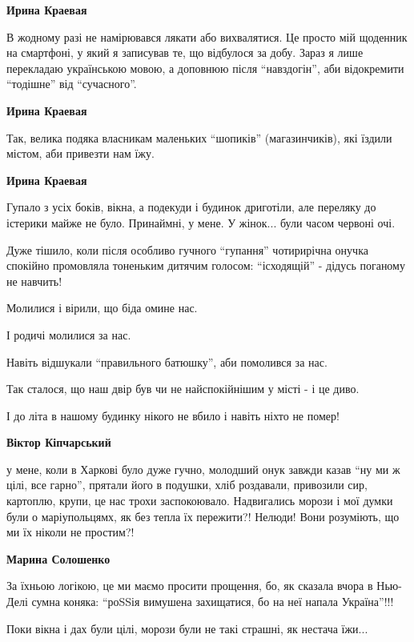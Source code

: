 \begin{itemize} %
\textbf{Ирина Краевая} 

В жодному разі не намірювався лякати або вихвалятися. Це просто мій щоденник на
смартфоні, у який я записував те, що відбулося за добу. Зараз я лише перекладаю
українською мовою, а доповнюю після \enquote{навздогін}, аби відокремити \enquote{тодішне} від
\enquote{сучасного}.

\textbf{Ирина Краевая} 

Так, велика подяка власникам маленьких \enquote{шопиків} (магазинчиків), які їздили містом, аби привезти нам їжу.

\textbf{Ирина Краевая} 

Гупало з усіх боків, вікна, а подекуди і будинок дриготіли, але переляку до
істерики майже не було. Принаймні, у мене. У жінок... були часом червоні очі.

Дуже тішило, коли після особливо гучного \enquote{гупання} чотирирічна онучка спокійно
промовляла тоненьким дитячим голосом: \enquote{ісходящій} - дідусь поганому не навчить!

Молилися і вірили, що біда омине нас.

І родичі молилися за нас.

Навіть відшукали \enquote{правильного батюшку}, аби помолився за нас.

Так сталося, що наш двір був чи не найспокійнішим у місті - і це диво.

І до літа в нашому будинку нікого не вбило і навіть ніхто не помер!

\textbf{Віктор Кіпчарський} 

у мене, коли в Харкові було дуже гучно, молодший онук завжди казав \enquote{ну ми ж
цілі, все гарно}, прятали його в подушки, хліб роздавали, привозили сир,
картоплю, крупи, це нас трохи заспокоювало. Надвигались морози і мої думки були
о маріупольцямх, як без тепла їх пережити?! Нелюди! Вони розуміють, що ми їх
ніколи не простим?!

\textbf{Марина Солошенко} 

За їхньою логікою, це ми маємо просити прощення, бо, як сказала вчора в
Нью-Делі сумна коняка: \enquote{роSSія вимушена захищатися, бо на неї напала
Україна}!!!

Поки вікна і дах були цілі, морози були не такі страшні, як нестача їжи...

\end{itemize} %

